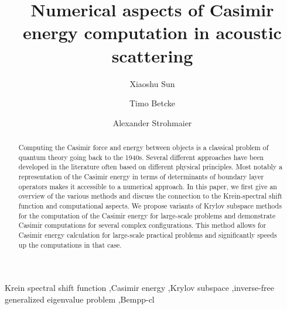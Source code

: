 \documentclass[review]{elsarticle}
\begin{document}
\begin{frontmatter}

\title{Numerical aspects of Casimir energy computation in acoustic scattering}


\author[mymainaddress]{Xiaoshu Sun}

\author[mymainaddress]{Timo Betcke}
\address[mymainaddress]{Department of Mathematics, University College London, London, WC1E 6BT, UK}

\author[mysecondaryaddress]{Alexander Strohmaier}
\address[mysecondaryaddress]{School of Mathematics, University of Leeds, Leeds, LS2 9JT, UK}




\begin{abstract}
    Computing the Casimir force and energy between objects is a classical problem of quantum theory going back to the 1940s. 
    Several different approaches have been developed in the literature often based on different physical principles. Most notably a representation 
    of the Casimir energy in terms of determinants of boundary layer operators makes it accessible to a numerical approach. In this paper, we first give 
    an overview of the various methods and discuss the connection to the Krein-spectral shift function and computational aspects.
    We propose variants of Krylov subspace methods for the computation of the Casimir energy for large-scale problems and demonstrate Casimir computations 
    for several complex configurations. This method allows for Casimir energy calculation for large-scale practical problems and significantly speeds up the computations in that 
    case.
   \end{abstract}

\begin{keyword}
Krein spectral shift function \sep Casimir energy \sep Krylov subspace \sep inverse-free generalized eigenvalue problem \sep Bempp-cl
\end{keyword}

\end{frontmatter}
\end{document}
